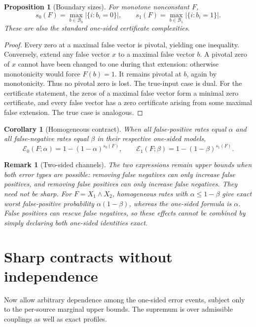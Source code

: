 \documentclass[11pt]{article}
\newtheorem{proposition}[theorem]{Proposition}
\newtheorem{corollary}[theorem]{Corollary}
\newtheorem{remark}[theorem]{Remark}
\newcommand{\Bzero}{\mathcal B_0}
\newcommand{\Bone}{\mathcal B_1}
\newcommand{\errzero}{\mathcal E_0}
\newcommand{\errone}{\mathcal E_1}
\begin{document}
\begin{proposition}[Boundary sizes]
For monotone nonconstant $F$,
\[
 s_0(F)=\max_{b\in\Bzero}|\{i:b_i=0\}|,
 \qquad
 s_1(F)=\max_{b\in\Bone}|\{i:b_i=1\}|.
\]
These are also the standard one-sided certificate complexities.
\end{proposition}

\begin{proof}
Every zero at a maximal false vector is pivotal, yielding one inequality.
Conversely, extend any false vector $x$ to a maximal false vector $b$.
A pivotal zero of $x$ cannot have been changed to one during that extension:
otherwise monotonicity would force $F(b)=1$. It remains pivotal at $b$,
again by monotonicity. Thus no pivotal zero is lost. The true-input case is
dual. For the certificate statement, the zeros of a maximal false vector
form a minimal zero certificate, and every false vector has a zero certificate
arising from some maximal false extension. The true case is analogous.
\end{proof}

\begin{corollary}[Homogeneous contract]
When all false-positive rates equal $\alpha$ and all false-negative rates
equal $\beta$ in their respective one-sided models,
\[
 \boxed{\errzero(F;\alpha)=1-(1-\alpha)^{s_0(F)}},\qquad
 \boxed{\errone(F;\beta)=1-(1-\beta)^{s_1(F)}}.
\]
\end{corollary}

\begin{remark}[Two-sided channels]
The two expressions remain upper bounds when both error types are possible:
removing false negatives can only increase false positives, and removing
false positives can only increase false negatives. They need not be sharp.
For $F=X_1\land X_2$, homogeneous rates with $\alpha\leq1-\beta$ give exact
worst false-positive probability $\alpha(1-\beta)$, whereas the one-sided
formula is $\alpha$. False positives can rescue false negatives, so these
effects cannot be combined by simply declaring both one-sided identities exact.
\end{remark}

\section{Sharp contracts without independence}

Now allow arbitrary dependence among the one-sided error events, subject
only to the per-source marginal upper bounds. The supremum is over admissible
couplings as well as exact profiles.
\end{document}
